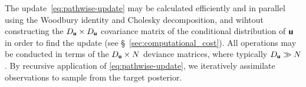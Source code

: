 The update~\eqref{eq:pathwise-update} may be calculated efficiently and in parallel using the Woodbury identity and Cholesky decomposition, and wihtout constructing the \(D_{\boldsymbol{\mathsf{u}}}\times D_{\boldsymbol{\mathsf{u}}}\) covariance matrix of the conditional distribution of \(\boldsymbol{\mathsf{u}}\) in order to find the update (see \S~\ref{sec:computational_cost}).
All operations may be conducted in terms of the \(D_{\boldsymbol{\mathsf{u}}}\times N\) deviance matrices, where typically \(D_{\boldsymbol{\mathsf{u}}}\gg N\).
By recursive application of \eqref{eq:pathwise-update}, we iteratively assimilate observations to sample from the target posterior.




